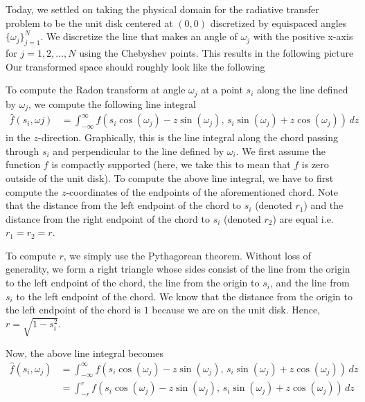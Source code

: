 
Today, we settled on taking the physical domain for the radiative transfer problem to be the unit disk centered at $(0, 0)$ discretized by equispaced angles $\{ \omega_j \}_{j=1}^{N}$.
We discretize the line that makes an angle of $\omega_{j}$ with the positive x-axis for $j = 1, 2, \hdots, N$ using the Chebyshev points.
This results in the following picture
Our transformed space should roughly look like the following
\par 
To compute the Radon transform at angle $\omega_{j}$ at a point $s_{i}$ along the line defined by $\omega_{j}$, we compute the following line integral
\begin{align*}
	\hat{f}(s_{i}, \omega{j}) & = \int_{-\infty}^{\infty} f(s_{i} \cos (\omega_{j}) - z \sin (\omega_{j}), \, s_{i} \sin (\omega_{j}) + z \cos (\omega_{j})) \, dz
\end{align*}
in the $z$-direction.
Graphically, this is the line integral along the chord passing through $s_{i}$ and perpendicular to the line defined by $\omega_{i}$.
We first assume the function $f$ is compactly supported (here, we take this to mean that $f$ is zero outside of the unit disk).
To compute the above line integral, we have to first compute the $z$-coordinates of the endpoints of the aforementioned chord.
Note that the distance from the left endpoint of the chord to $s_{i}$ (denoted $r_{1}$) and the distance from the right endpoint of the chord to $s_{i}$ (denoted $r_{2}$) are equal i.e. $r_{1} = r_{2} = r$.
\par 
To compute $r$, we simply use the Pythagorean theorem.
Without loss of generality, we form a right triangle whose sides consist of the line from the origin to the left endpoint of the chord, the line from the origin to $s_{i}$, and the line from $s_{i}$ to the left endpoint of the chord.
We know that the distance from the origin to the left endpoint of the chord is $1$ because we are on the unit disk. 
Hence, $r = \sqrt{1 - s_{i}^{2}}$. 
\par 
Now, the above line integral becomes
\begin{align*}
	\hat{f}(s_{i}, \omega_{j}) & = \int_{-\infty}^{\infty} f(s_{i} \cos (\omega_{j}) - z \sin (\omega_{j}), \, s_{i} \sin (\omega_{j}) + z \cos (\omega_{j})) \, dz \\
	& = \int_{-r}^{r} f(s_{i} \cos (\omega_{j}) - z \sin (\omega_{j}), \, s_{i} \sin (\omega_{j}) + z \cos (\omega_{j})) \, dz
\end{align*}
